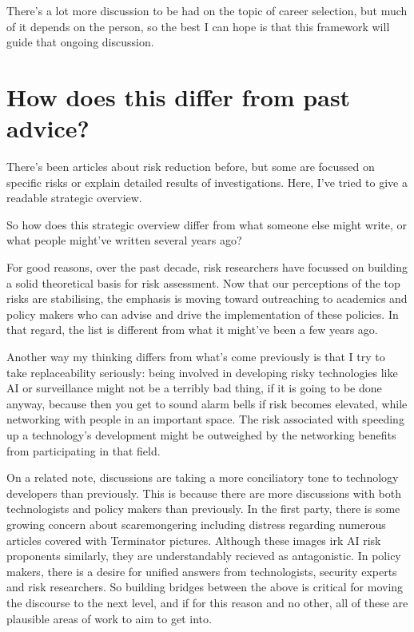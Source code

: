 ﻿\documentclass[12pt]{article}
\begin{document}
There's a lot more discussion to be had on the topic of career selection, but much of it depends on the person, 
so the best I can hope is that this framework will guide that ongoing discussion.

\section{How does this differ from past advice?}
There's been articles about risk reduction before, but some are focussed on specific risks or explain detailed 
results of investigations. Here, I've tried to give a readable strategic overview.

So how does this strategic overview differ from what someone else might write, or what people might've written 
several years ago?

For good reasons, over the past decade, risk researchers have focussed on building a solid 
theoretical basis for risk assessment. Now that our perceptions of the top risks are stabilising, 
the emphasis is moving toward outreaching to academics and policy makers who can advise and drive 
the implementation of these policies. In that regard, the list is different from what it might've been a few years ago.

Another way my thinking differs from what's come previously is that I try to take replaceability 
seriously: being involved in developing risky technologies like AI or surveillance might not be 
a terribly bad thing, if it is going to be done anyway, because then you get to sound alarm bells 
if risk becomes elevated, while networking with people in an important space. The risk associated 
with speeding up a technology's development might be outweighed by the networking benefits from 
participating in that field.

On a related note, discussions are taking a more conciliatory tone to technology developers than 
previously. This is because 
there are more discussions with both technologists and policy makers than previously. 
In the first party, there is some growing concern about scaremongering including distress regarding 
numerous articles covered with Terminator pictures. Although these images irk AI risk proponents similarly, they are 
understandably recieved as antagonistic. In policy makers, there is a desire for unified answers from 
technologists, security experts and risk researchers. So building bridges between the above is critical 
for moving the discourse to the next level, and if for this reason and no other, all of these are plausible 
areas of work to aim to get into.
\end{document}
